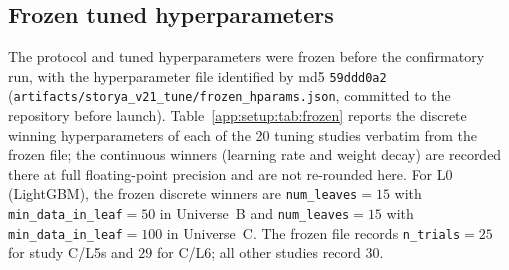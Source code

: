 \documentclass{article}
\begin{document}
\subsection{Frozen tuned hyperparameters}\label{app:setup:frozen}

The protocol and tuned hyperparameters were frozen before the confirmatory run, with the hyperparameter file identified by md5 \texttt{59ddd0a2} (\texttt{artifacts/storya\_v21\_tune/frozen\_hparams.json}, committed to the repository before launch). Table~\ref{app:setup:tab:frozen} reports the discrete winning hyperparameters of each of the 20 tuning studies verbatim from the frozen file; the continuous winners (learning rate and weight decay) are recorded there at full floating-point precision and are not re-rounded here.
For L0 (LightGBM), the frozen discrete winners are \texttt{num\_leaves}${}=15$ with \texttt{min\_data\_in\_leaf}${}=50$ in Universe~B and \texttt{num\_leaves}${}=15$ with \texttt{min\_data\_in\_leaf}${}=100$ in Universe~C.
The frozen file records \texttt{n\_trials}${}=25$ for study C/L5s and $29$ for C/L6; all other studies record $30$.
\end{document}
